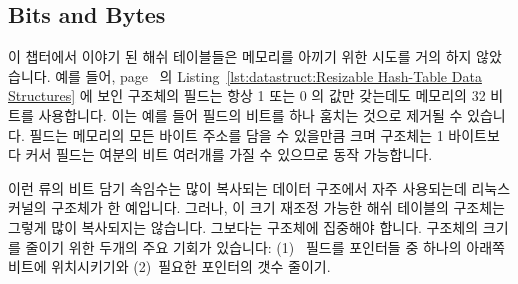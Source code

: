 \subsection{Bits and Bytes}
\label{sec:datastruct:Bits and Bytes}

이 챕터에서 이야기 된 해쉬 테이블들은 메모리를 아끼기 위한 시도를 거의 하지
않았습니다.
예를 들어,
page~\pageref{lst:datastruct:Resizable Hash-Table Data Structures} 의
Listing~\ref{lst:datastruct:Resizable Hash-Table Data Structures} 에 보인
 구조체의  필드는 항상 1 또는 0 의 값만 갖는데도 메모리의
32 비트를 사용합니다.
이는 예를 들어  필드의 비트를 하나 훔치는 것으로 제거될 수
있습니다.
 필드는 메모리의 모든 바이트 주소를 담을 수 있을만큼 크며
 구조체는 1 바이트보다 커서  필드는 여분의
비트 여러개를 가질 수 있으므로 동작 가능합니다.

이런 류의 비트 담기 속임수는 많이 복사되는 데이터 구조에서 자주 사용되는데
리눅스 커널의  구조체가 한 예입니다.
그러나, 이 크기 재조정 가능한 해쉬 테이블의  구조체는 그렇게 많이
복사되지는 않습니다.
그보다는  구조체에 집중해야 합니다.
 구조체의 크기를 줄이기 위한 두개의 주요 기회가 있습니다:
(1)~ 필드를  포인터들 중 하나의 아래쪽 비트에
위치시키기와 (2)~필요한 포인터의 갯수 줄이기.

